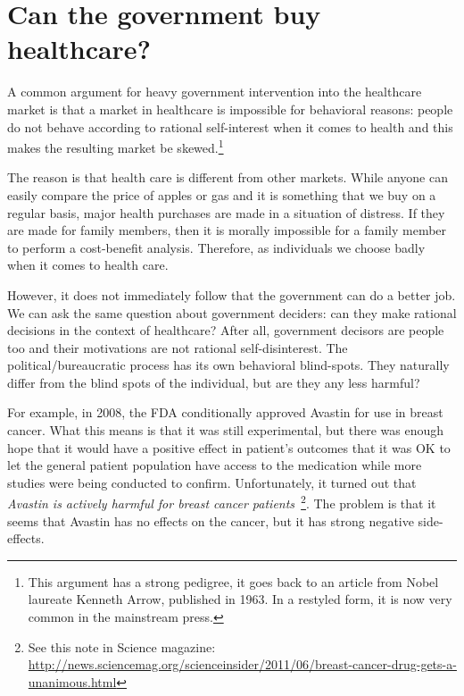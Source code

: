 \section{Can the government buy healthcare?}

A common argument for heavy government intervention into the healthcare market
is that a market in healthcare is impossible for behavioral reasons: people do
not behave according to rational self-interest when it comes to health and this
makes the resulting market be skewed.\footnote{This argument has a strong
pedigree, it goes back to an article from Nobel laureate Kenneth Arrow,
published in 1963. In a restyled form, it is now very common in the mainstream
press.}

The reason is that health care is different from other markets. While anyone
can easily compare the price of apples or gas and it is something that we buy
on a regular basis, major health purchases are made in a situation of distress.
If they are made for family members, then it is morally impossible for a family
member to perform a cost-benefit analysis. Therefore, as individuals we choose
badly when it comes to health care.

However, it does not immediately follow that the government can do a better
job. We can ask the same question about government deciders: can they make
rational decisions in the context of healthcare? After all, government decisors
are people too and their motivations are not rational self-disinterest. The
political/bureaucratic process has its own behavioral blind-spots. They
naturally differ from the blind spots of the individual, but are they any less
harmful?

For example, in 2008, the FDA conditionally approved Avastin for use in breast
cancer. What this means is that it was still experimental, but there was enough
hope that it would have a positive effect in patient's outcomes that it was OK
to let the general patient population have access to the medication while more
studies were being conducted to confirm. Unfortunately, it turned out that
\emph{Avastin is actively harmful for breast cancer
patients}~\cite{avastin-harfmul}\footnote{See this note in Science magazine:
\url{http://news.sciencemag.org/scienceinsider/2011/06/breast-cancer-drug-gets-a-unanimous.html}}.
The problem is that it seems that Avastin has no effects on the cancer, but it
has strong negative side-effects.

